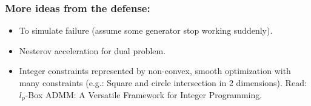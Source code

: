 
{
\begin{frame}[noframenumbering]\frametitle{More ideas from the defense:}
\begin{itemize}

\item  To simulate failure (assume some generator stop working suddenly).

\item Nesterov acceleration for dual problem.

\item Integer constraints represented by non-convex, smooth optimization with many constraints (e.g.: Square and circle intersection in 2 dimensions). Read: $\mathit{l}_p$-Box ADMM: A Versatile Framework for Integer Programming.

\end{itemize}
\end{frame}
}